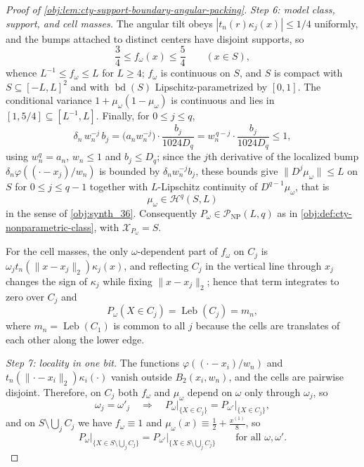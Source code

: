 \documentclass[11pt]{article}
\begin{document}
\begin{proof}[Proof of \cref{obj:lem:cty-support-boundary-angular-packing}]
\emph{Step 6: model class, support, and cell masses.}  The angular tilt obeys \(|t_n(r)\kappa_j(x)|\le1/4\) uniformly, and the bumps attached to distinct centers have disjoint supports, so
\[
\frac34\le f_\omega(x)\le\frac54
\qquad (x\in S),
\]
whence \(L^{-1}\le f_\omega\le L\) for \(L\ge4\); \(f_\omega\) is continuous on \(S\), and \(S\) is compact with \(S\subseteq[-L,L]^2\) and with \(\operatorname{bd}(S)\) Lipschitz-parametrized by \([0,1]\).  The conditional variance \(1+\mu_\omega(1-\mu_\omega)\) is continuous and lies in \([1,5/4]\subseteq[L^{-1},L]\).  Finally, for \(0\le j\le q\),
\[
\delta_n\,w_n^{-j}\,b_j
=
\bigl(a_nw_n^{-j}\bigr)\cdot\frac{b_j}{1024D_q}
=
w_n^{\,q-j}\cdot\frac{b_j}{1024D_q}
\le 1,
\]
using \(w_n^{q}=a_n\), \(w_n\le1\) and \(b_j\le D_q\); since the \(j\)th derivative of the localized bump \(\delta_n\varphi((\cdot-x_j)/w_n)\) is bounded by \(\delta_nw_n^{-j}b_j\), these bounds give \(\lVert D^j\mu_\omega\rVert\le L\) on \(S\) for \(0\le j\le q-1\) together with \(L\)-Lipschitz continuity of \(D^{q-1}\mu_\omega\), that is
\[
\mu_\omega\in\mathcal H^q(S,L)
\]
in the sense of \cref{obj:synth_36}.  Consequently \(P_\omega\in\mathcal P_{\mathrm{NP}}(L,q)\) as in \cref{obj:def:cty-nonparametric-class}, with \(\mathcal X_{P_\omega}=S\).

For the cell masses, the only \(\omega\)-dependent part of \(f_\omega\) on \(C_j\) is \(\omega_jt_n(\lVert x-x_j\rVert_2)\kappa_j(x)\), and reflecting \(C_j\) in the vertical line through \(x_j\) changes the sign of \(\kappa_j\) while fixing \(\lVert x-x_j\rVert_2\); hence that term integrates to zero over \(C_j\) and
\[
P_\omega(X\in C_j)=\operatorname{Leb}(C_j)=m_n ,
\]
where \(m_n=\operatorname{Leb}(C_1)\) is common to all \(j\) because the cells are translates of each other along the lower edge.

\emph{Step 7: locality in one bit.}  The functions \(\varphi((\cdot-x_i)/w_n)\) and \(t_n(\lVert\cdot-x_i\rVert_2)\kappa_i(\cdot)\) vanish outside \(B_2(x_i,w_n)\), and the cells are pairwise disjoint.  Therefore, on \(C_j\) both \(f_\omega\) and \(\mu_\omega\) depend on \(\omega\) only through \(\omega_j\), so
\[
\omega_j=\omega'_j
\quad\Longrightarrow\quad
P_\omega\big|_{\{X\in C_j\}}=P_{\omega'}\big|_{\{X\in C_j\}},
\]
and on \(S\setminus\bigcup_jC_j\) we have \(f_\omega\equiv1\) and \(\mu_\omega(x)\equiv\tfrac12+\tfrac{x^{(1)}}{8}\), so
\[
P_\omega\big|_{\{X\in S\setminus\bigcup_jC_j\}}
=
P_{\omega'}\big|_{\{X\in S\setminus\bigcup_jC_j\}}
\qquad\text{for all }\omega,\omega' .
\]


\end{proof}
\end{document}
